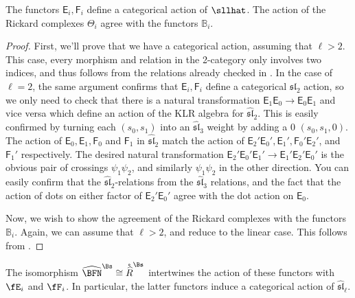 \begin{theorem}
 The functors $\mathsf{E}_{i},\mathsf{F}_{i}$ define a categorical action of $\sllhat$.  The action of the Rickard complexes $\Theta_i$  agree with the functors $\mathbb{B}_i$.  
\end{theorem}
\begin{proof}
First, we'll prove that we have a categorical action, assuming that $\ell>2$.  This case, every morphism and relation in the 2-category only involves two indices, and thus follows from the relations already checked in \cite[Th. 4.20]{Webweb}.  In the case of $\ell=2$, the same argument confirms that $\mathsf{E}_{i},\mathsf{F}_{i}$ define a categorical $\mathfrak{sl}_2$ action, so we only need to check that there is a natural transformation $\mathsf{E}_{1}\mathsf{E}_{0}\to \mathsf{E}_{0}\mathsf{E}_{1}$ and vice versa which define an action of the KLR algebra for $\mathfrak{\widehat{sl}}_2$.  This is easily confirmed by turning each $(s_0,s_1)$ into an $\mathfrak{\widehat{sl}}_3$ weight by adding a 0 $(s_0,s_1,0)$.  The action of $\mathsf{E}_{0},\mathsf{E}_{1},\mathsf{F}_{0}$ and $\mathsf{F}_{1}$ in $\mathfrak{\widehat{sl}}_2$ match the action of  $\mathsf{E}_{2}'\mathsf{E}_{0}',\mathsf{E}_{1}',\mathsf{F}_{0}'\mathsf{E}_{2}'$, and $\mathsf{F}_{1}'$ respectively.  The desired natural transformation $\mathsf{E}_{2}'\mathsf{E}_{0}'\mathsf{E}_{1}'\to \mathsf{E}_{1}'\mathsf{E}_{2}'\mathsf{E}_{0}'$ is the obvious pair of crossings $\psi_1\psi_2$, and similarly $\psi_1\psi_2$ in the other direction.  You can easily confirm that the $\mathfrak{\widehat{sl}}_2$-relations from the $\mathfrak{\widehat{sl}}_3$ relations, and the fact that the action of dots on either factor of $\mathsf{E}_{2}'\mathsf{E}_{0}'$ agree with the dot action on $\mathsf{E}_0$.  

Now, we wish to show the agreement of the Rickard complexes with the functors $\mathbb{B}_i$.  Again, we can assume that $\ell>2$, and reduce to the linear case.  This follows from \cite[Thm. 5.3]{Webweb}.
\end{proof}

\begin{theorem}
  The isomorphism $\widehat{\BFN}^\Bs\cong \mathring{\widehat{R}}^\Bs$
  intertwines the action of these functors with $\fE_i$ and $\fF_i$.
  In particular, the latter functors induce a categorical action of $\mathfrak{\widehat{sl}}_\ell$.
\end{theorem}

